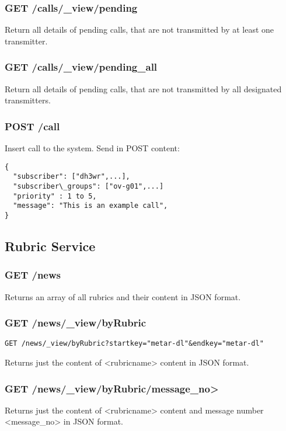 \subsubsection{GET /calls/\_view/pending}

Return all details of pending calls, that are not transmitted by at least one transmitter.

\subsubsection{GET /calls/\_view/pending\_all}
Return all details of pending calls, that are not transmitted by all designated transmitters.

\subsubsection{POST /call}
Insert call to the system. Send in POST content:
\begin{lstlisting}
{
  "subscriber": ["dh3wr",...],
  "subscriber\_groups": ["ov-g01",...]
  "priority" : 1 to 5,
  "message": "This is an example call",
}
\end{lstlisting}

\subsection{Rubric Service}

\subsubsection{GET /news}
Returns an array of all rubrics and their content in JSON format.

\subsubsection{GET /news/\_view/byRubric}
\begin{verbatim}
GET /news/_view/byRubric?startkey="metar-dl"&endkey="metar-dl"
\end{verbatim}

Returns just the content of <rubricname> content in JSON format.

\subsubsection{GET /news/\_view/byRubric/message\_no>}
Returns just the content of <rubricname> content and message number <message\_no> in JSON format.


